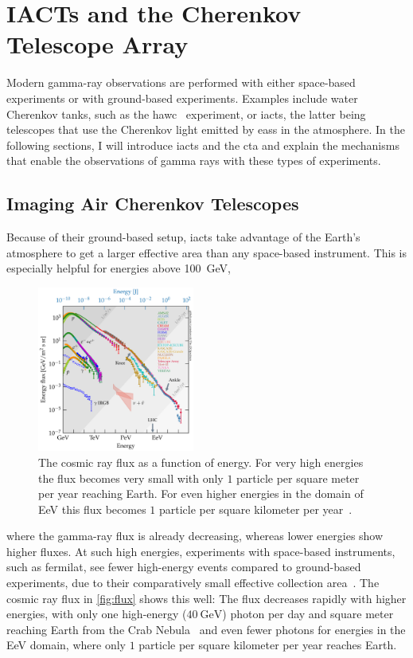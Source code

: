 \chapter{IACTs and the Cherenkov Telescope Array}%
\label{ch:IACTs_and_CTA}
%

Modern gamma-ray observations are performed with either space-based experiments or with
ground-based experiments. Examples include water Cherenkov tanks, such as the \gls{hawc}~\cite{hawc} experiment, or \glspl{iact}, the latter
being telescopes that use the Cherenkov light emitted by \glspl{eas} in the atmosphere.
In the following sections, I will introduce \glspl{iact} and the \gls{cta} and explain the mechanisms
that enable the observations of gamma rays with these types of experiments.


\section{Imaging Air Cherenkov Telescopes}%
\label{sec:iact}

Because of their ground-based setup, \glspl{iact} take advantage of the Earth's atmosphere to get a
larger effective area than any space-based instrument. This is especially helpful for energies above
\SI{100}{\giga\eV},
\begin{figure}
    \centering
    \vspace*{-0.5cm}
    \includegraphics[width=0.46\textwidth]{graphics/cr_spectrum.pdf}
    \caption{The cosmic ray flux as a function of energy. For very high energies the flux becomes very
    small with only \(\num{1}\) particle per square meter per year reaching Earth. For even higher
    energies in the domain of \si{\exa\eV} this flux becomes \(\num{1}\) particle per square
    kilometer per year~\cite{carmelo_2020}.}%
    \label{fig:flux}
\end{figure}
where the gamma-ray flux is already decreasing, whereas lower energies show higher fluxes. At such high energies,
experiments with space-based instruments, such as \gls{fermilat}, see fewer high-energy events compared
to ground-based experiments, due to their comparatively small effective collection area~\cite[p.~256]{funk}.
The cosmic ray flux in \autoref{fig:flux} shows this well: The flux decreases rapidly with higher
energies, with only one high-energy (\greater\(\SI{40}{\giga\eV}\)) photon per day and square meter
reaching Earth from the Crab Nebula~\cite{noethe_thesis} and even fewer photons for energies in the
\si{\exa\eV} domain, where only \(\num{1}\) particle per square kilometer per year reaches Earth.

